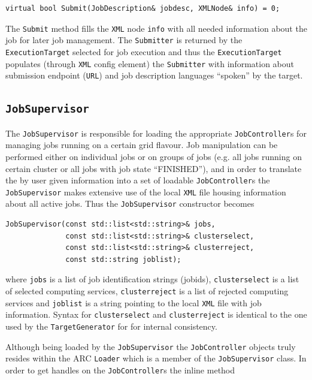 \documentclass{book}
\newcommand{\TargetGenerator}{\texttt{TargetGenerator}}
\newcommand{\ExecutionTarget}{\texttt{ExecutionTarget}}
\newcommand{\Submitter}{\texttt{Submitter}}
\newcommand{\JobSupervisor}{\texttt{JobSupervisor}}
\newcommand{\JobController}{\texttt{JobController}}
\newcommand{\URL}{\texttt{URL}}
\newcommand{\XML}{\texttt{XML}}
\newcommand{\Loader}{\texttt{Loader}}
\begin{document}
\begin{shaded}
\begin{verbatim}
virtual bool Submit(JobDescription& jobdesc, XMLNode& info) = 0;
\end{verbatim}
\end{shaded}

The \texttt{Submit} method fills the {\XML} node \texttt{info} with all needed information about the job for later job management. 
The {\Submitter} is returned by the {\ExecutionTarget} selected for job execution and thus the {\ExecutionTarget} populates 
(through {\XML} config element) the {\Submitter} with information about submission endpoint ({\URL}) and job description languages 
``spoken'' by the target.

\subsection{{\JobSupervisor}} The {\JobSupervisor} is responsible for loading the appropriate {\JobController}s for managing 
jobs running on a certain grid flavour. Job manipulation can be performed either on individual jobs or on groups of jobs (e.g. 
all jobs running on certain cluster or all jobs with job state ``FINISHED''), and in order to translate the by user given 
information into a set of loadable {\JobController}s the {\JobSupervisor} makes extensive use of the local {\XML} file housing 
information about all active jobs. Thus the {\JobSupervisor} constructor becomes

\begin{shaded}
\begin{verbatim}
JobSupervisor(const std::list<std::string>& jobs,
              const std::list<std::string>& clusterselect,
              const std::list<std::string>& clusterreject,
              const std::string joblist);
\end{verbatim}
\end{shaded}

where \texttt{jobs} is a list of job identification strings (jobids), \texttt{clusterselect} is a list of selected computing services, 
\texttt{clusterreject} is a list of rejected computing services and \texttt{joblist} is a string pointing to the local {\XML} file 
with job information. Syntax for \texttt{clusterselect} and \texttt{clusterreject} is identical to the one used by the {\TargetGenerator}
for for internal consistency.

Although being loaded by the {\JobSupervisor} the {\JobController} objects truly resides within the ARC {\Loader} which is a member 
of the {\JobSupervisor} class. In order to get handles on the {\JobController}s the inline method
\end{document}
